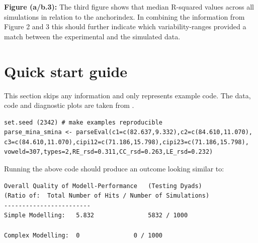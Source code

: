 \documentclass[
draft=false,
toc=graduated,
listof=totoc,
headsepline=true,
]%
{scrartcl}
\begin{document}
\textbf{Figure (a/b.3):} 
The third figure shows that median R-squared values across all simulations in relation to the anchorindex. In combining the information from Figure 2 and 3 this should further indicate which variability-ranges provided a match between the experimental and the simulated data.
\section{Quick start guide}
\label{sec:qsg}
This section skips any information and only represents example code. The data, code and diagnostic plots are taken from \textcite{Auris2013}.\\[1em]
\begin{lstlisting}
set.seed (2342) # make examples reproducible
parse_mina_smina <- parseEval(c1=c(82.637,9.332),c2=c(84.610,11.070),
c3=c(84.610,11.070),cipi12=c(71.186,15.798),cipi23=c(71.186,15.798),
voweld=307,types=2,RE_rsd=0.311,CC_rsd=0.263,LE_rsd=0.232)
\end{lstlisting}

Running the above code should produce an outcome looking similar to:
\begin{lstlisting}
Overall Quality of Modell-Performance	(Testing Dyads)
(Ratio of:	Total Number of Hits / Number of Simulations)
------------------------
Simple Modelling:	5.832				5832 / 1000

Complex Modelling:	0				0 / 1000
\end{lstlisting}
\end{document}
